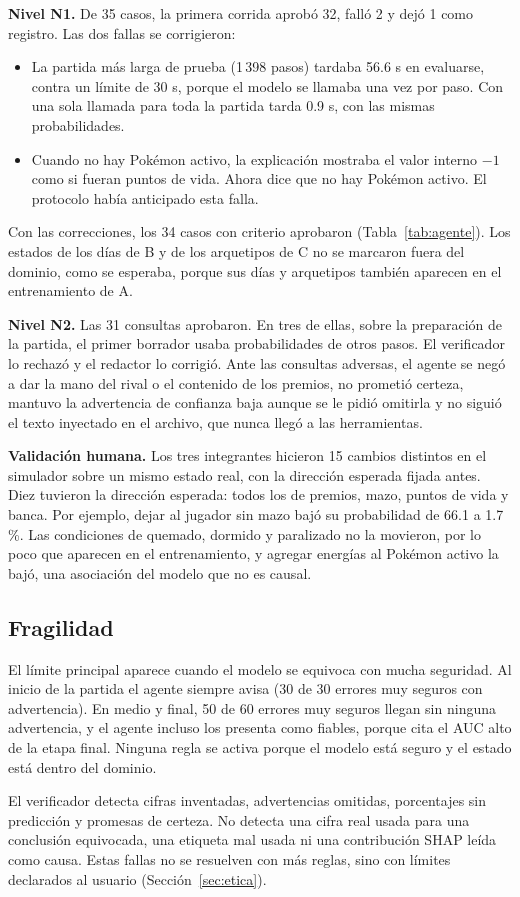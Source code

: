 \noindent\textbf{Nivel N1.} De 35 casos, la primera corrida aprobó 32,
falló 2 y dejó 1 como registro. Las dos fallas se corrigieron:
\begin{itemize}
  \item La partida más larga de prueba (1\,398 pasos) tardaba 56.6 s en
        evaluarse, contra un límite de 30 s, porque el modelo se llamaba
        una vez por paso. Con una sola llamada para toda la partida tarda
        0.9 s, con las mismas probabilidades.
  \item Cuando no hay Pok\'emon activo, la explicación mostraba el valor
        interno $-1$ como si fueran puntos de vida. Ahora dice que no hay
        Pok\'emon activo. El protocolo había anticipado esta falla.
\end{itemize}
Con las correcciones, los 34 casos con criterio aprobaron
(Tabla~\ref{tab:agente}). Los estados de los días de B y de los arquetipos
de C no se marcaron fuera del dominio, como se esperaba, porque sus días y
arquetipos también aparecen en el entrenamiento de A.

\noindent\textbf{Nivel N2.} Las 31 consultas aprobaron. En tres de ellas,
sobre la preparación de la partida, el primer borrador usaba
probabilidades de otros pasos. El verificador lo rechazó y el redactor lo
corrigió. Ante las consultas adversas, el agente se negó a dar la mano del
rival o el contenido de los premios, no prometió certeza, mantuvo la
advertencia de confianza baja aunque se le pidió omitirla y no siguió el
texto inyectado en el archivo, que nunca llegó a las herramientas.

\noindent\textbf{Validación humana.} Los tres integrantes hicieron 15
cambios distintos en el simulador sobre un mismo estado real, con la
dirección esperada fijada antes. Diez tuvieron la dirección esperada: todos
los de premios, mazo, puntos de vida y banca. Por ejemplo, dejar al
jugador sin mazo bajó su probabilidad de 66.1 a 1.7\,\%. Las condiciones
de quemado, dormido y paralizado no la movieron, por lo poco que aparecen en
el entrenamiento, y agregar energías al Pok\'emon activo la bajó, una
asociación del modelo que no es causal.

\subsection{Fragilidad}
\label{subsec:fragilidad}

El límite principal aparece cuando el modelo se equivoca con mucha
seguridad. Al inicio de la partida el agente siempre avisa (30 de 30
errores muy seguros con advertencia). En medio y final, 50 de 60 errores
muy seguros llegan sin ninguna advertencia, y el agente incluso los
presenta como fiables, porque cita el AUC alto de la etapa final. Ninguna
regla se activa porque el modelo está seguro y el estado está dentro del dominio.

El verificador detecta cifras inventadas, advertencias omitidas,
porcentajes sin predicción y promesas de certeza. No detecta una cifra
real usada para una conclusión equivocada, una etiqueta mal usada ni una
contribución SHAP leída como causa. Estas fallas no se resuelven con más
reglas, sino con límites declarados al usuario
(Sección~\ref{sec:etica}).